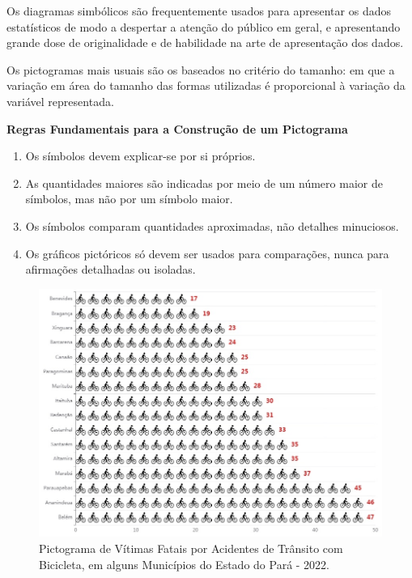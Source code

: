Os diagramas simbólicos são frequentemente usados para apresentar os dados estatísticos de modo a despertar a atenção do público em geral, e apresentando grande dose de originalidade e de habilidade na arte de apresentação dos dados.\vskip0.3cm

Os pictogramas mais usuais são os baseados no critério do tamanho: em que a variação em área do tamanho das formas utilizadas é proporcional à variação da variável representada.\vskip0.3cm



\textbf{Regras Fundamentais para a Construção de um Pictograma}

\begin{enumerate}
    \item Os símbolos devem explicar-se por si próprios.
    \item As quantidades maiores são indicadas por meio de um
    número maior de símbolos, mas não por um símbolo maior.
    \item Os símbolos comparam quantidades aproximadas, não
    detalhes minuciosos.
    \item Os gráficos pictóricos só devem ser usados para
    comparações, nunca para afirmações detalhadas ou isoladas.
\end{enumerate}






\begin{figure}[H]
    \centering
\includegraphics[scale=0.25,height=230pt,width=12cm]{figures/pictograma1.jpeg}
\vspace{-0.5cm}
    \caption{Pictograma de Vítimas Fatais por Acidentes de Trânsito com Bicicleta, em alguns Municípios do Estado do Pará - 2022.}
    \label{fig:my_label50}
\end{figure}

